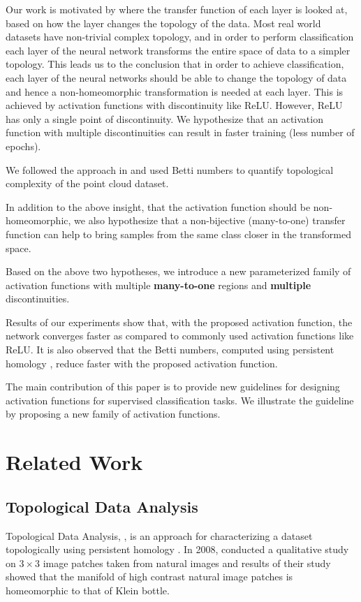 \documentclass[wcp]{jmlr}
\begin{document}
Our work is motivated by \cite{naitzat2020topology} where the transfer function of each layer is looked at, based on  how the layer changes the topology of the data. Most real world datasets have non-trivial complex topology, and in order to perform classification each layer of the neural network transforms the entire space of data to a simpler topology. This leads us to the conclusion that in order to achieve classification, each layer of the neural networks should be able to change the topology of data and hence a non-homeomorphic transformation is needed at each layer. This is achieved by activation functions with discontinuity like ReLU. However, ReLU has only a single point of discontinuity. We hypothesize that an activation function with multiple discontinuities can result in faster training (less number of epochs).

We followed the approach in \cite{naitzat2020topology} and used Betti numbers to quantify  topological complexity of the point cloud dataset.

In addition to the above insight, that the activation function should be non-homeomorphic, we also hypothesize that a non-bijective (many-to-one) transfer function can help to bring samples from the same class closer in the transformed space.

Based on the above two  hypotheses, we introduce a new parameterized family of activation functions with multiple \textbf{many-to-one} regions and \textbf{multiple} discontinuities.

Results of our experiments show that, with the proposed activation function, the network converges faster as compared to commonly used activation functions like ReLU. It is also observed that the Betti numbers, computed using persistent homology \cite{naitzat2020topology}, reduce faster with the proposed activation function.

The main contribution of this paper is to provide new guidelines for designing  activation functions for supervised classification tasks. We illustrate the guideline by proposing a new family of activation functions.

\section{Related Work}
\subsection{Topological Data Analysis}
Topological Data Analysis, \cite{chazal2021introduction, smith2021topological}, is an approach for characterizing a dataset topologically using persistent homology \cite{edelsbrunner2008persistent}. In 2008, \cite{carlsson2008local} conducted a qualitative study on  $3\times3$ image patches taken from natural images and  results of their study showed that the manifold of  high contrast natural image patches is homeomorphic to that of Klein bottle.
\end{document}
